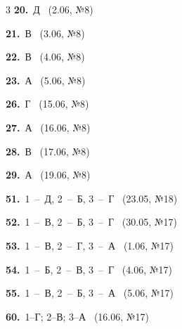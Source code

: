 \documentclass[12pt]{article}
\begin{document}
\ifshowsolutions
{}
\begin{multicols}{3}\noindent
\noindent\textbf{20.}~Д \ {\scriptsize\color{gray}(2.06, №8)}\par
\noindent\textbf{21.}~В \ {\scriptsize\color{gray}(3.06, №8)}\par
\noindent\textbf{22.}~В \ {\scriptsize\color{gray}(4.06, №8)}\par
\noindent\textbf{23.}~А \ {\scriptsize\color{gray}(5.06, №8)}\par
\noindent\textbf{26.}~Г \ {\scriptsize\color{gray}(15.06, №8)}\par
\noindent\textbf{27.}~А \ {\scriptsize\color{gray}(16.06, №8)}\par
\noindent\textbf{28.}~В \ {\scriptsize\color{gray}(17.06, №8)}\par
\noindent\textbf{29.}~А \ {\scriptsize\color{gray}(19.06, №8)}\par
\noindent\textbf{51.}~1~--~Д, 2~--~Б, 3~--~Г \ {\scriptsize\color{gray}(23.05, №18)}\par
\noindent\textbf{52.}~1~--~В, 2~--~Б, 3~--~Г \ {\scriptsize\color{gray}(30.05, №17)}\par
\noindent\textbf{53.}~1~--~В, 2~--~Г, 3~--~А \ {\scriptsize\color{gray}(1.06, №17)}\par
\noindent\textbf{54.}~1~--~Б, 2~--~В, 3~--~Г \ {\scriptsize\color{gray}(4.06, №17)}\par
\noindent\textbf{55.}~1~--~В, 2~--~Б, 3~--~А \ {\scriptsize\color{gray}(5.06, №17)}\par
\noindent\textbf{60.}~1--Г; 2--В; 3--А \ {\scriptsize\color{gray}(16.06, №17)}\par
\end{multicols}
\fi

\endgroup
\end{document}
